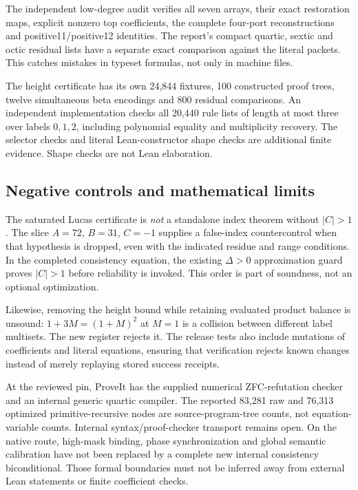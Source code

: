 The independent low-degree audit verifies all seven arrays, their exact
restoration maps, explicit nonzero top coefficients, the complete four-port
reconstructions and positive11/positive12 identities. The report's compact
quartic, sextic and octic residual lists have a separate exact comparison
against the literal packets. This catches mistakes in typeset formulas,
not only in machine files.

The height certificate has its own 24,844 fixtures, 100 constructed proof
trees, twelve simultaneous beta encodings and 800 residual comparisons.
An independent implementation checks all 20,440 rule lists of length at
most three over labels $0,1,2$, including polynomial equality and
multiplicity recovery. The selector checks and literal Lean-constructor
shape checks are additional finite evidence. Shape checks are not Lean
elaboration.

\subsection{Negative controls and mathematical limits}
The saturated Lucas certificate is \emph{not} a standalone index theorem
without $|C|>1$. The slice $A=72$, $B=31$, $C=-1$ supplies a false-index
countercontrol when that hypothesis is dropped, even with the indicated
residue and range conditions. In the completed consistency equation, the
existing $\Delta>0$ approximation guard proves $|C|>1$ before reliability
is invoked. This order is part of soundness, not an optional optimization.

Likewise, removing the height bound while retaining evaluated product
balance is unsound: $1+3M=(1+M)^2$ at $M=1$ is a collision between
different label multisets. The new register rejects it. The release tests
also include mutations of coefficients and literal equations, ensuring
that verification rejects known changes instead of merely replaying
stored success receipts.

At the reviewed pin, ProveIt has the supplied numerical ZFC-refutation
checker and an internal generic quartic compiler. The reported 83,281 raw
and 76,313 optimized primitive-recursive nodes are source-program-tree
counts, not equation-variable counts. Internal syntax/proof-checker
transport remains open. On the native route, high-mask binding, phase
synchronization and global semantic calibration have not been replaced by
a complete new internal consistency biconditional. Those formal boundaries
must not be inferred away from external Lean statements or finite
coefficient checks.

